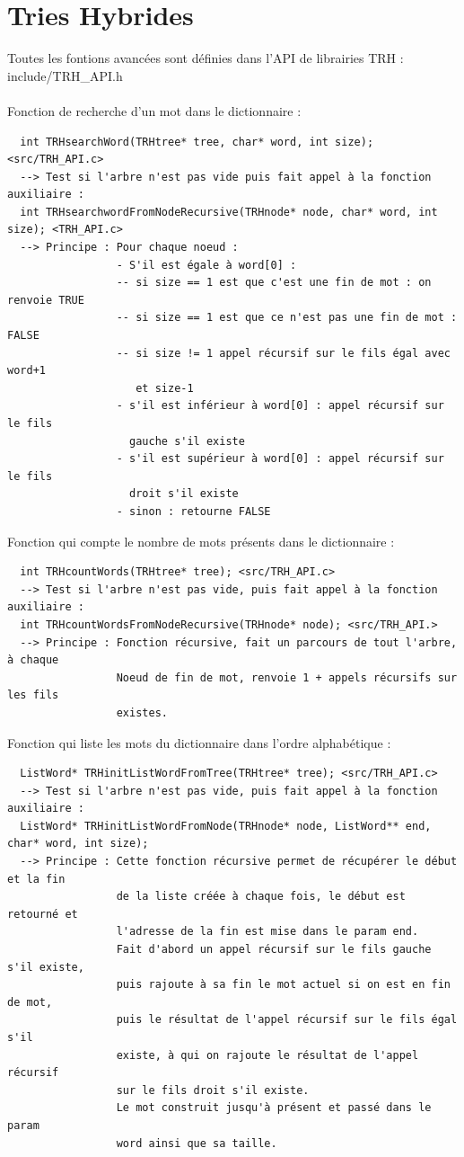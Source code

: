 \documentclass[a4paper,8pt]{report}
\begin{document}
\section*{Tries Hybrides}\label{sec:name}
Toutes les fontions avancées sont définies dans l'API de librairies TRH : include/TRH\_API.h\\ \\
Fonction de recherche d'un mot dans le dictionnaire :
\begin{verbatim}
  int TRHsearchWord(TRHtree* tree, char* word, int size); <src/TRH_API.c>
  --> Test si l'arbre n'est pas vide puis fait appel à la fonction auxiliaire :
  int TRHsearchwordFromNodeRecursive(TRHnode* node, char* word, int size); <TRH_API.c>
  --> Principe : Pour chaque noeud :
                 - S'il est égale à word[0] :
                 -- si size == 1 est que c'est une fin de mot : on renvoie TRUE
                 -- si size == 1 est que ce n'est pas une fin de mot : FALSE
                 -- si size != 1 appel récursif sur le fils égal avec word+1
                    et size-1
                 - s'il est inférieur à word[0] : appel récursif sur le fils
                   gauche s'il existe
                 - s'il est supérieur à word[0] : appel récursif sur le fils
                   droit s'il existe
                 - sinon : retourne FALSE
\end{verbatim}
Fonction qui compte le nombre de mots présents dans le dictionnaire :
\begin{verbatim}
  int TRHcountWords(TRHtree* tree); <src/TRH_API.c>
  --> Test si l'arbre n'est pas vide, puis fait appel à la fonction auxiliaire :
  int TRHcountWordsFromNodeRecursive(TRHnode* node); <src/TRH_API.>
  --> Principe : Fonction récursive, fait un parcours de tout l'arbre, à chaque
                 Noeud de fin de mot, renvoie 1 + appels récursifs sur les fils
                 existes.
\end{verbatim}
Fonction qui liste les mots du dictionnaire dans l'ordre alphabétique :
\begin{verbatim}
  ListWord* TRHinitListWordFromTree(TRHtree* tree); <src/TRH_API.c>
  --> Test si l'arbre n'est pas vide, puis fait appel à la fonction auxiliaire :
  ListWord* TRHinitListWordFromNode(TRHnode* node, ListWord** end, char* word, int size);
  --> Principe : Cette fonction récursive permet de récupérer le début et la fin
                 de la liste créée à chaque fois, le début est retourné et
                 l'adresse de la fin est mise dans le param end.
                 Fait d'abord un appel récursif sur le fils gauche s'il existe,
                 puis rajoute à sa fin le mot actuel si on est en fin de mot,
                 puis le résultat de l'appel récursif sur le fils égal s'il
                 existe, à qui on rajoute le résultat de l'appel récursif
                 sur le fils droit s'il existe.
                 Le mot construit jusqu'à présent et passé dans le param
                 word ainsi que sa taille.
\end{verbatim}
\end{document}
